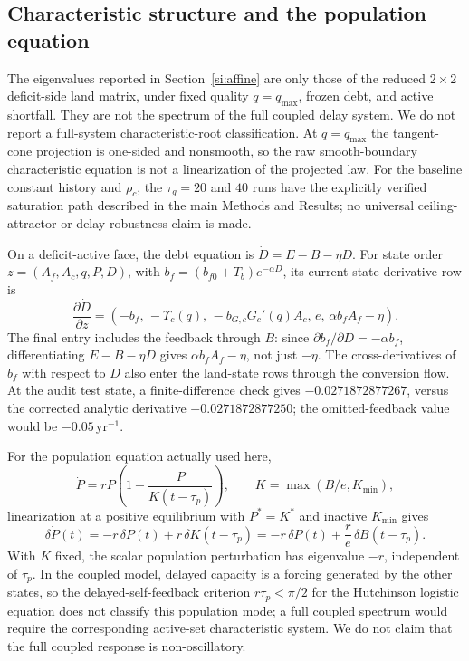 \documentclass[11pt,a4paper]{article}
\newcommand{\Ups}{\Upsilon_c}
\begin{document}
\subsection{Characteristic structure and the population equation}\label{si:char}

The eigenvalues reported in Section~\ref{si:affine} are only those of the reduced $2\times2$ deficit-side land matrix, under fixed quality $q=q_{\max}$, frozen debt, and active shortfall. They are not the spectrum of the full coupled delay system. We do not report a full-system characteristic-root classification. At $q=q_{\max}$ the tangent-cone projection is one-sided and nonsmooth, so the raw smooth-boundary characteristic equation is not a linearization of the projected law. For the baseline constant history and $\rho_c$, the $\tau_g=20$ and $40$ runs have the explicitly verified saturation path described in the main Methods and Results; no universal ceiling-attractor or delay-robustness claim is made.

On a deficit-active face, the debt equation is $\dot D=E-B-\eta D$. For state order $z=(A_f,A_c,q,P,D)$, with $b_f=(b_{f0}+T_b)e^{-\alpha D}$, its current-state derivative row is
\begin{equation}
\frac{\partial\dot D}{\partial z}=\left(-b_f,\,-\Ups(q),\,-b_{G,c}G_c'(q)A_c,\,e,\,\alpha b_fA_f-\eta\right).
\end{equation}
The final entry includes the feedback through $B$: since $\partial b_f/\partial D=-\alpha b_f$, differentiating $E-B-\eta D$ gives $\alpha b_fA_f-\eta$, not just $-\eta$. The cross-derivatives of $b_f$ with respect to $D$ also enter the land-state rows through the conversion flow. At the audit test state, a finite-difference check gives $-0.0271872877267$, versus the corrected analytic derivative $-0.0271872877250$; the omitted-feedback value would be $-0.05$\,yr$^{-1}$.

For the population equation actually used here,
\begin{equation}
\dot P=rP\left(1-\frac{P}{K(t-\tau_p)}\right),\qquad K=\max(B/e,K_{\min}),
\end{equation}
linearization at a positive equilibrium with $P^*=K^*$ and inactive $K_{\min}$ gives
\begin{equation}
\delta\dot P(t)=-r\,\delta P(t)+r\,\delta K(t-\tau_p)=-r\,\delta P(t)+\frac{r}{e}\,\delta B(t-\tau_p).
\end{equation}
With $K$ fixed, the scalar population perturbation has eigenvalue $-r$, independent of $\tau_p$. In the coupled model, delayed capacity is a forcing generated by the other states, so the delayed-self-feedback criterion $r\tau_p<\pi/2$ for the Hutchinson logistic equation \citep{Hutchinson1948} does not classify this population mode; a full coupled spectrum would require the corresponding active-set characteristic system. We do not claim that the full coupled response is non-oscillatory.
\end{document}
